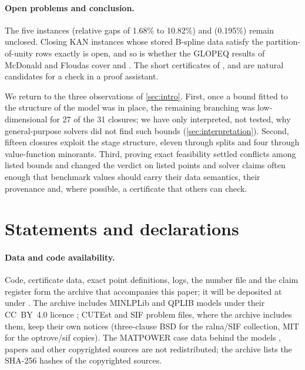 \paragraph{Open problems and conclusion.}\label{sec:conclusion-open}
The five  instances (relative gaps of 1.68\% to 10.82\%) and  (0.195\%) remain unclosed.
Closing KAN instances whose stored B-spline data satisfy the partition-of-unity rows exactly is open, and so is whether the GLOPEQ results of McDonald and Floudas cover  and .
The short certificates of ,  and  are natural candidates for a check in a proof assistant.

We return to the three observations of \cref{sec:intro}.
First, once a bound fitted to the structure of the model was in place, the remaining branching was low-dimensional for 27 of the 31 closures; we have only interpreted, not tested, why general-purpose solvers did not find such bounds (\cref{sec:interpretation}).
Second, fifteen closures exploit the stage structure, eleven through splits and four through value-function minorants.
Third, proving exact feasibility settled conflicts among listed bounds and changed the verdict on listed points and solver claims often enough that benchmark values should carry their data semantics, their provenance and, where possible, a certificate that others can check.

\section*{Statements and declarations}

\paragraph{Data and code availability.}
Code, certificate data, exact point definitions, logs, the number file and the claim register form the archive that accompanies this paper; it will be deposited at \archiveDOI{} under .
The archive includes MINLPLib and QPLIB models under their CC~BY~4.0 licence \citep{vigerske2026-minlplib-a-library-of-mixed,furini2018-qplib-a-library-of-quadratic}; CUTEst and SIF problem files, where the archive includes them, keep their own notices (three-clause BSD for the ralna/SIF collection, MIT for the optrove/sif copies).
The MATPOWER case data behind the  models \citep{zimmerman2011-matpower-steady-state-operations-planning}, papers and other copyrighted sources are not redistributed; the archive lists the SHA-256 hashes of the copyrighted sources.

